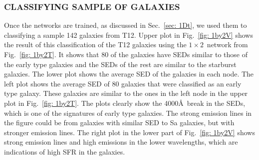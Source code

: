         \subsubsection{CLASSIFYING SAMPLE OF GALAXIES}
         \label{sec: 1Dv}
            Once the networks are trained, as discussed in Sec.~\ref{sec: 1Dt}, we used them to classifying a sample 142 galaxies from T12.
            Upper plot in Fig.~\ref{fig: 1by2V} shows the result of this classification of the T12 galaxies using the $1\times2$~network from Fig.~\ref{fig: 1by2T}.
            It shows that 80 of the galaxies have SEDs similar to those of the early type galaxies and the SEDs of the rest are similar to the starburst galaxies.
            The lower plot shows the average SED of the galaxies in each node. 
            The left plot shows the average SED of 80 galaxies that were classified as an early type galaxy. 
            These galaxies are similar to the ones in the left node in the upper plot in Fig.~\ref{fig: 1by2T}.
            The plots clearly show the 4000\AA~break in the SEDs, which is one of the signatures of early type galaxies.
            The strong emission lines in the figure could be from galaxies with similar SED to Sa galaxies, but with stronger emission lines.
            The right plot in the lower part of Fig.~\ref{fig: 1by2V} shows strong emission lines and high emissions in the lower wavelengths, which are indications of high SFR in the galaxies. 
